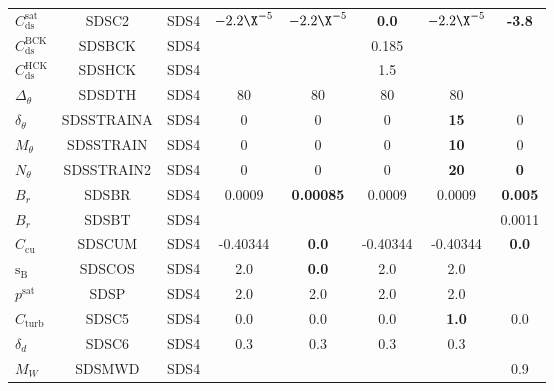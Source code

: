 \begin{landscape}
\begin{table}
\begin{center}
\begin{tabular}{|l|c|c|c|c|c|c|c|}
  $C_{\mathrm{ds}}^{\mathrm{sat}}$ & SDSC2         & SDS4      &$-2.2\X^{-5}$&$-2.2\X^{-5}$     &\textbf{0.0}  &$-2.2\X^{-5}$&  \textbf{-3.8}  \\
  $C_{\mathrm{ds}}^{\mathrm{BCK}}$ & SDSBCK        & SDS4      &            &                   & 0.185        &             & \\
  $C_{\mathrm{ds}}^{\mathrm{HCK}}$ & SDSHCK        & SDS4      &            &                   &  1.5         &             & \\
  $\Delta_\theta$                  & SDSDTH        & SDS4      & 80          & 80               & 80           &  80         & \\
  $\delta_\theta$                  & SDSSTRAINA    & SDS4      & 0           & 0                & 0            & \textbf{15} &  0  \\
  $M_\theta$                       & SDSSTRAIN     & SDS4      & 0           & 0                & 0            & \textbf{10} &  0  \\
  $N_\theta$                       & SDSSTRAIN2    & SDS4      & 0           & 0                & 0            & \textbf{20} &  \textbf{0}   \\
  $B_r$                            & SDSBR         & SDS4      & 0.0009      &\textbf{0.00085}  & 0.0009       & 0.0009      &  \textbf{0.005}  \\
  $B_r$                            & SDSBT         & SDS4      &             &                  &              &             &    0.0011     \\
  $C_{\mathrm{cu}}$                & SDSCUM        & SDS4      & -0.40344    & \textbf{0.0}     &-0.40344      &-0.40344     & \textbf{0.0} \\
  ${\mathrm{s_B}}$                 & SDSCOS        &SDS4       & 2.0         & \textbf{0.0}     & 2.0          & 2.0         &     \\
  $p^{\mathrm{sat}}$               & SDSP          & SDS4      & 2.0         & 2.0              & 2.0          & 2.0         &     \\
  $C_{\mathrm{turb}}$              & SDSC5         & SDS4      & 0.0         &  0.0             & 0.0          & \textbf{1.0}& 0.0 \\
  $\delta_d$                       & SDSC6         & SDS4      & 0.3         &  0.3             & 0.3          &0.3          & \\
  $ M_W$			   & SDSMWD	   & SDS4      &            &                   &              &             & 0.9 \\

\end{tabular}
\end{center}
\end{table}
\end{landscape}

